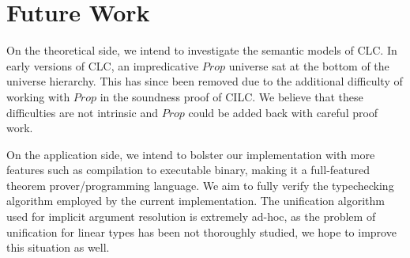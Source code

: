 \documentclass[sigplan,screen,review,authordraft]{acmart}
\begin{document}
\section{Future Work}
On the theoretical side, we intend to investigate the semantic models of CLC. In early versions of CLC, an impredicative $Prop$ universe sat at the bottom of the universe hierarchy. This has since been removed due to the additional difficulty of working with $Prop$ in the soundness proof of CILC. We believe that these difficulties are not intrinsic and $Prop$ could be added back with careful proof work.

On the application side, we intend to bolster our implementation with more features such as compilation to executable binary, making it a full-featured theorem prover/programming language. We aim to fully verify the typechecking algorithm employed by the current implementation. The unification algorithm used for implicit argument resolution is extremely ad-hoc, as the problem of unification for linear types has been not thoroughly studied, we hope to improve this situation as well.




\end{document}
